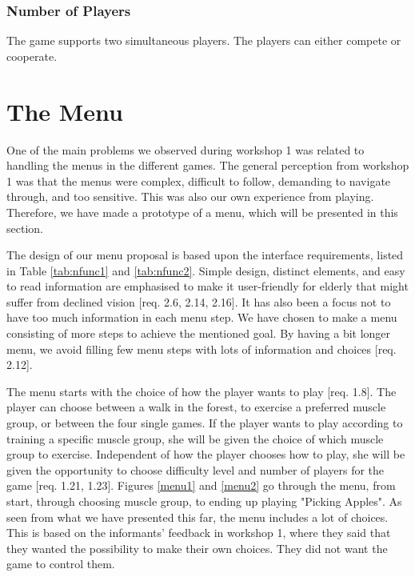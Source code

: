 \subsubsection{Number of Players} 
The game supports two simultaneous players. The players can either compete or cooperate. 


\section{The Menu}
\label{sec:menu}

One of the main problems we observed during workshop 1 was related to handling the menus in the different games. The general perception from workshop 1 was that the menus were complex, difficult to follow, demanding to navigate through, and too sensitive. This was also our own experience from playing. Therefore, we have made a prototype of a menu, which will be presented in this section.

The design of our menu proposal is based upon the interface requirements, listed in Table \ref{tab:nfunc1} and \ref{tab:nfunc2}. Simple design, distinct elements, and easy to read information are emphasised to make it user-friendly for elderly that might suffer from declined vision [req. 2.6, 2.14, 2.16]. It has also been a focus not to have too much information in each menu step. We have chosen to make a menu consisting of more steps to achieve the mentioned goal. By having a bit longer menu, we avoid filling few menu steps with lots of information and choices [req. 2.12].    

The menu starts with the choice of how the player wants to play [req. 1.8]. The player can choose between a walk in the forest, to exercise a preferred muscle group, or between the four single games. If the player wants to play according to training a specific muscle group, she will be given the choice of which muscle group to exercise. Independent of how the player chooses how to play, she will be given the opportunity to choose difficulty level and number of players for the game [req. 1.21, 1.23]. Figures \ref{menu1} and \ref{menu2} go through the menu, from start, through choosing muscle group, to ending up playing "Picking Apples". As seen from what we have presented this far, the menu includes a lot of choices. This is based on the informants' feedback in workshop 1, where they said that they wanted the possibility to make their own choices. They did not want the game to control them.   

